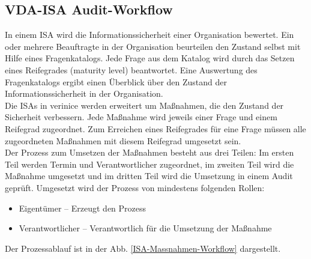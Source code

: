 \documentclass[a4paper,10pt]{book}
\begin{document}
\subsection{VDA-ISA Audit-Workflow}
In einem ISA wird die Informationssicherheit einer Organisation bewertet. Ein oder mehrere Beauftragte in der Organisation beurteilen den
Zustand selbst mit Hilfe eines Fragenkatalogs. Jede Frage aus dem Katalog wird durch das Setzen eines Reifegrades (maturity level) beantwortet.
Eine Auswertung des Fragenkatalogs ergibt einen Überblick über den Zustand der Informationssicherheit in der Organisation.
\newline\\
Die ISAs in verinice werden erweitert um Maßnahmen, die den Zustand der Sicherheit verbessern. Jede Maßnahme wird jeweils einer Frage und
einem Reifegrad zugeordnet. Zum Erreichen eines Reifegrades für eine Frage müssen alle zugeordneten Maßnahmen mit diesem Reifegrad umgesetzt sein.
\newline\\
Der Prozess zum Umsetzen der Maßnahmen besteht aus drei Teilen: Im ersten Teil werden Termin und Verantwortlicher zugeordnet,
im zweiten Teil wird die Maßnahme umgesetzt und im dritten Teil wird die Umsetzung in einem Audit geprüft. Umgesetzt wird der Prozess von mindestens
folgenden Rollen:
\begin{itemize}
\item Eigentümer – Erzeugt den Prozess
\item Verantwortlicher – Verantwortlich für die Umsetzung der Maßnahme
\end{itemize}
Der Prozessablauf ist in der Abb. \ref{ISA-Massnahmen-Workflow} dargestellt.
\end{document}
